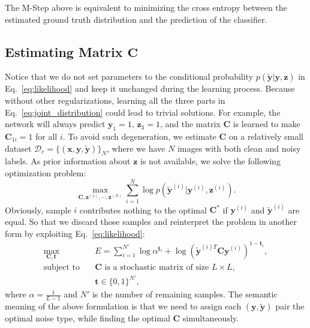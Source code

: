 \documentclass[10pt,twocolumn,letterpaper]{article}
\def\vec{\mathbf}
\def\mat{\mathbf}
\begin{document}
The M-Step above is equivalent to minimizing the cross entropy between the estimated ground truth distribution and the prediction of the classifier.

\subsection{Estimating Matrix $\mat{C}$} %
\label{sub:confusion_estimation}
Notice that we do not set parameters to the conditional probability $p(\tilde{\vec{y}}|\vec{y},\vec{z})$ in Eq.~\eqref{eq:likelihood} and keep it unchanged during the learning process. Because without other regularizations, learning all the three parts in Eq.~\eqref{eq:joint_distribution} could lead to trivial solutions. For example, the network will always predict $\vec{y}_1 = 1$, $\vec{z}_3 = 1$, and the matrix $\mat{C}$ is learned to make $\mat{C}_{1i} = 1$ for all $i$. To avoid such degeneration, we estimate $\mat{C}$ on a relatively small dataset $\mathcal{D}_c = \{(\vec{x},\vec{y},\tilde{\vec{y}})\}_N$, where we have $N$ images with both clean and noisy labels. As prior information about $\vec{z}$ is not available, we solve the following optimization problem:
\begin{equation} \label{eq:opt_all}
    \max_{\mat{C},\vec{z}^{(1)},\cdots,\vec{z}^{(N)}} \sum_{i=1}^N \log p(\tilde{\vec{y}}^{(i)}|\vec{y}^{(i)},\vec{z}^{(i)}).
\end{equation}
Obviously, sample $i$ contributes nothing to the optimal $\mat{C}^*$ if $\vec{y}^{(i)}$ and $\tilde{\vec{y}}^{(i)}$ are equal. So that we discard those samples and reinterpret the problem in another form by exploiting Eq.~\eqref{eq:likelihood}:
\begin{equation}
\begin{aligned}
\max_{\mat{C},\vec{t}} \quad & E=\sum_{i=1}^{N'} \log \alpha^{\vec{t}_i} + \log (\tilde{\vec{y}}^{(i)T} \mat{C} \vec{y}^{(i)})^{1-\vec{t}_i},\\
\text{subject to} \quad & \mat{C} \text{ is a stochastic matrix of size } L\times L, \\
                    & \vec{t} \in \{0,1\}^{N'},
\end{aligned}
\end{equation}
where $\alpha=\frac{1}{L-1}$ and $N'$ is the number of remaining samples. The semantic meaning of the above formulation is that we need to assign each $(\vec{y},\tilde{\vec{y}})$ pair the optimal noise type, while finding the optimal $\mat{C}$ simultaneously.
\end{document}
